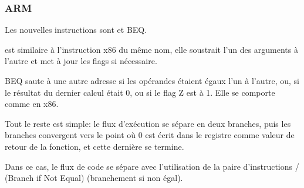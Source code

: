 \subsubsection{ARM}





Les nouvelles instructions sont \CMP et \ac{BEQ}.

\CMP est similaire à l'instruction x86 du même nom, elle soustrait l'un des arguments
à l'autre et met à jour les flags si nécessaire.

\ac{BEQ} saute à une autre adresse si les opérandes étaient égaux l'un à l'autre,
ou, si le résultat du dernier calcul était 0, ou si le flag Z est à 1.
Elle se comporte comme \JZ en x86.

Tout le reste est simple: le flux d'exécution se sépare en deux branches, puis les
branches convergent vers le point où 0 est écrit dans le registre  comme
valeur de retour de la fonction, et cette dernière se termine.




Dans ce cas, le flux de code se sépare avec l'utilisation de la paire d'instructions
/ (Branch if Not Equal) (branchement si non égal).

